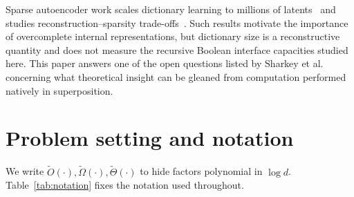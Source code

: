 \documentclass[preprint,12pt]{elsarticle}
\theoremstyle{definition}
\newcommand{\Otilde}{\widetilde{O}}
\newcommand{\Omegatilde}{\widetilde{\Omega}}
\newcommand{\Thetatilde}{\widetilde{\Theta}}
\begin{document}
Sparse autoencoder work scales dictionary learning to millions of
latents~\cite{cunningham2023sparse,gao2024scaling,lieberum2024gemma} and studies
reconstruction--sparsity trade-offs~\cite{michaud2025manifolds}. Such results motivate the
importance of overcomplete internal representations, but dictionary size is a reconstructive
quantity and does not measure the recursive Boolean interface capacities studied here. This
paper answers one of the open questions listed by Sharkey et al.~\cite{sharkey2025open}
concerning what theoretical insight can be gleaned from computation performed natively in
superposition.

\section{Problem setting and notation}
\label{sec:setting}

We write $\Otilde(\cdot),\Omegatilde(\cdot),\Thetatilde(\cdot)$ to hide factors polynomial in
$\log d$. Table~\ref{tab:notation} fixes the notation used throughout.
\end{document}
